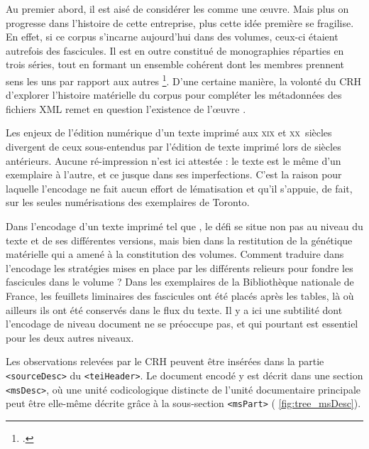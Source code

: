Au premier abord, il est aisé de considérer les \odm{} comme une \oe{}uvre. Mais plus on progresse dans l'histoire de cette entreprise, plus cette idée première se fragilise. En effet, si ce corpus s'incarne aujourd'hui dans des volumes, ceux-ci étaient autrefois des fascicules. Il est en outre constitué de monographies réparties en trois séries, tout en formant un ensemble cohérent dont les membres \og prennent sens les uns par rapport aux autres \fg{}\footcite[p. 5]{chenu}. D'une certaine manière, la volonté du CRH d'explorer l'histoire matérielle du corpus pour compléter les métadonnées des fichiers XML remet en question l'existence de \og l'\oe{}uvre \odm{} \fg{}.

Les enjeux de l'édition numérique d'un texte imprimé aux \textsc{xix}\ieme{} et \textsc{xx}\ieme~siècles divergent de ceux sous-entendus par l'édition de texte imprimé lors de siècles antérieurs. Aucune ré-impression n'est ici attestée : le texte est le même d'un exemplaire à l'autre, et ce jusque dans ses imperfections. C'est la raison pour laquelle l'encodage ne fait aucun effort de lématisation et qu'il s'appuie, de fait, sur les seules numérisations des exemplaires de Toronto.

Dans l'encodage d'un texte imprimé tel que \lodm{}, le défi se situe non pas au niveau du texte et de ses différentes versions, mais bien dans la restitution de la génétique matérielle qui a amené à la constitution des volumes. Comment traduire dans l'encodage les stratégies mises en place par les différents relieurs pour fondre les fascicules dans le volume ? Dans les exemplaires de la Bibliothèque nationale de France, les feuillets liminaires des fascicules ont été placés après les tables, là où ailleurs ils ont été conservés dans le flux du texte. Il y a ici une subtilité dont l'encodage de niveau \og document \fg{} ne se préoccupe pas, et qui pourtant est essentiel pour les deux autres niveaux.

Les observations relevées par le CRH peuvent être insérées dans la partie \texttt{<sourceDesc>} du \texttt{<teiHeader>}. Le document encodé y est décrit dans une section \texttt{<msDesc>}, où une unité codicologique distincte de l'unité documentaire principale peut être elle-même décrite grâce à la sous-section \texttt{<msPart>} (\fig{} \ref{fig:tree_msDesc}).

